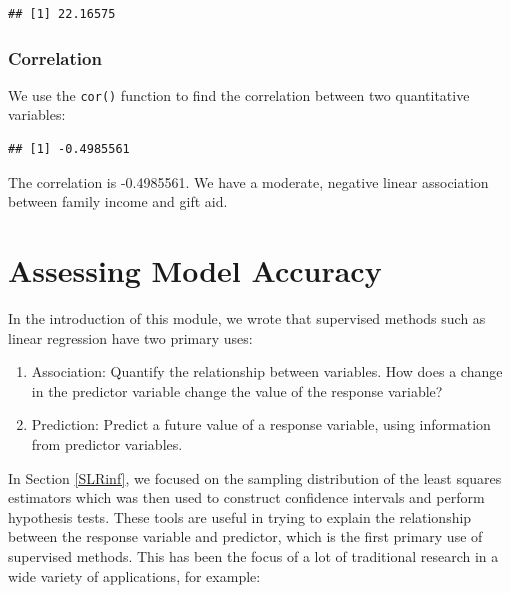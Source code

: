 \documentclass[
]{book}
\newenvironment{Shaded}{\begin{snugshade}}{\end{snugshade}}
\newcommand{\DocumentationTok}[1]{\textcolor[rgb]{0.56,0.35,0.01}{\textbf{\textit{#1}}}}
\newcommand{\FunctionTok}[1]{\textcolor[rgb]{0.13,0.29,0.53}{\textbf{#1}}}
\newcommand{\NormalTok}[1]{#1}
\newcommand{\SpecialCharTok}[1]{\textcolor[rgb]{0.81,0.36,0.00}{\textbf{#1}}}
\providecommand{\tightlist}{%
  \setlength{\itemsep}{0pt}\setlength{\parskip}{0pt}}
\begin{document}
\begin{verbatim}
## [1] 22.16575
\end{verbatim}

\subsubsection*{Correlation}\label{correlation-1}

We use the \texttt{cor()} function to find the correlation between two quantitative variables:

\begin{Shaded}
\end{Shaded}

\begin{verbatim}
## [1] -0.4985561
\end{verbatim}

The correlation is -0.4985561. We have a moderate, negative linear association between family income and gift aid.

\section{Assessing Model Accuracy}\label{assessing-model-accuracy}

In the introduction of this module, we wrote that supervised methods such as linear regression have two primary uses:

\begin{enumerate}
\def\labelenumi{\arabic{enumi}.}
\tightlist
\item
  Association: Quantify the relationship between variables. How does a change in the predictor variable change the value of the response variable?
\item
  Prediction: Predict a future value of a response variable, using information from predictor variables.
\end{enumerate}

In Section \ref{SLRinf}, we focused on the sampling distribution of the least squares estimators which was then used to construct confidence intervals and perform hypothesis tests. These tools are useful in trying to explain the relationship between the response variable and predictor, which is the first primary use of supervised methods. This has been the focus of a lot of traditional research in a wide variety of applications, for example:
\end{document}

